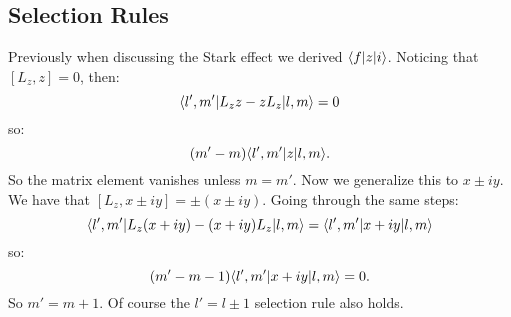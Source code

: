 \subsection{Selection Rules}
Previously when discussing the Stark effect we derived $\langle f \rvert z\lvert i \rangle$. Noticing that $[L_z, z] = 0$, then:
\begin{equation}
    \langle l', m' \rvert L_zz - zL_z\lvert l, m \rangle = 0
\end{equation}
so:
\begin{equation}
    (m'-m)\langle l',m' \rvert z\lvert l,m \rangle.
\end{equation}
So the matrix element vanishes unless $m = m'$. Now we generalize this to $x \pm iy$. We have that $[L_z, x\pm iy] = \pm(x \pm iy)$. Going through the same steps:
\begin{equation}
    \langle l',m' \rvert L_z(x+iy) - (x+iy)L_z\lvert l, m \rangle = \langle l',m' \rvert x+iy\lvert l,m \rangle
\end{equation}
so:
\begin{equation}
    (m'-m-1)\langle l',m' \rvert x+iy\lvert l,m \rangle = 0.
\end{equation}
So $m' = m + 1$. Of course the $l' = l \pm 1$ selection rule also holds.